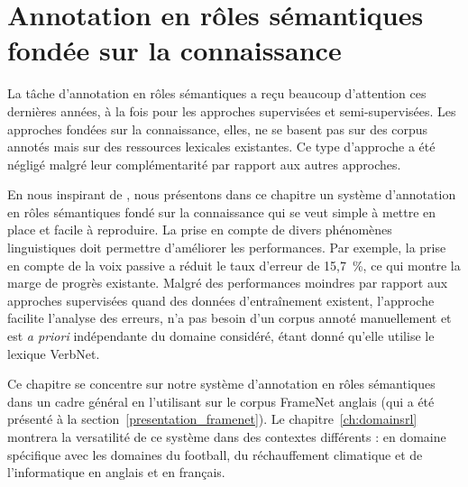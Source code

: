 \chapter{Annotation en rôles sémantiques fondée sur la connaissance}
\label{ch:srl}



La tâche d'annotation en rôles sémantiques a reçu beaucoup d'attention ces
dernières années, à la fois pour les approches supervisées et semi-supervisées.
Les approches fondées sur la connaissance, elles, ne se basent pas sur des
corpus annotés mais sur des ressources lexicales existantes. Ce type d'approche
a été négligé malgré leur complémentarité par rapport aux autres approches.

En nous inspirant de \cite{swier2004unsupervised,swier2005exploiting}, nous
présentons dans ce chapitre un système d'annotation en rôles sémantiques fondé
sur la connaissance qui se veut simple à mettre en place et facile à
reproduire. La prise en compte de divers phénomènes linguistiques doit
permettre d'améliorer les performances. Par exemple, la prise en compte de la
voix passive a réduit le taux d'erreur de 15,7~\%, ce qui montre la marge de
progrès existante. Malgré des performances moindres par rapport aux approches
supervisées quand des données d'entraînement existent, l'approche facilite
l'analyse des erreurs, n'a pas besoin d'un corpus annoté manuellement et est
\textit{a priori} indépendante du domaine considéré, étant donné qu'elle
utilise le lexique VerbNet.

Ce chapitre se concentre sur notre système d'annotation en rôles sémantiques
dans un cadre général en l'utilisant sur le corpus FrameNet anglais (qui a été
présenté à la section~\ref{presentation_framenet}). Le
chapitre~\ref{ch:domainsrl} montrera la versatilité de ce système dans des
contextes différents : en domaine spécifique avec les domaines du football, du
réchauffement climatique et de l'informatique en anglais et en français.

